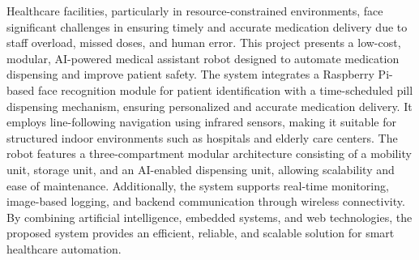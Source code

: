 Healthcare facilities, particularly in resource-constrained environments, face significant challenges in ensuring timely and accurate medication delivery due to staff overload, missed doses, and human error. This project presents a low-cost, modular, AI-powered medical assistant robot designed to automate medication dispensing and improve patient safety. The system integrates a Raspberry Pi-based face recognition module for patient identification with a time-scheduled pill dispensing mechanism, ensuring personalized and accurate medication delivery. It employs line-following navigation using infrared sensors, making it suitable for structured indoor environments such as hospitals and elderly care centers. The robot features a three-compartment modular architecture consisting of a mobility unit, storage unit, and an AI-enabled dispensing unit, allowing scalability and ease of maintenance. Additionally, the system supports real-time monitoring, image-based logging, and backend communication through wireless connectivity. By combining artificial intelligence, embedded systems, and web technologies, the proposed system provides an efficient, reliable, and scalable solution for smart healthcare automation.